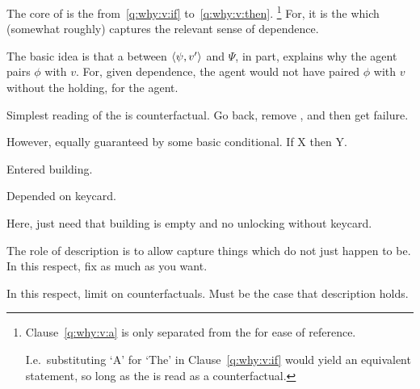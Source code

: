 \begin{note}
  The core of \qWhyV{} is the \itc{} from~\ref{q:why:v:if} to~\ref{q:why:v:then}.%
  \footnote{
    Clause~\ref{q:why:v:a} is only separated from the \itc{} for ease of reference.

    I.e.\ substituting `A' for `The' in Clause~\ref{q:why:v:if} would yield an equivalent statement, so long as the \itc{} is read as a counterfactual.
  }
  For, it is the \itc{} which (somewhat roughly) captures the relevant sense of dependence.
\end{note}

\begin{note}
    The basic idea is that a \ros{} between \(\langle \psi, v' \rangle\) and \(\Psi\), in part, explains why the agent pairs \(\phi\) with \(v\).
  For, given dependence, the agent would not have paired \(\phi\) with \(v\) without the \ros{} holding, for the agent.
\end{note}

\begin{note}
  Simplest reading of the \itc{} is counterfactual.
  Go back, remove \ros{}, and then get failure.

  However, equally guaranteed by some basic conditional.
  If X then Y.

  Entered building.

  Depended on keycard.

  Here, just need that building is empty and no unlocking without keycard.
\end{note}

\begin{note}
  The role of description is to allow capture things which do not just happen to be.
  In this respect, fix as much as you want.

  In this respect, limit on counterfactuals.
  Must be the case that description holds.
\end{note}

